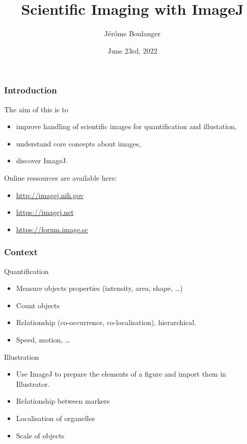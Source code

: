 \documentclass[ignorenonframetext,aspectratio=169,10pt,xcolor=table]{beamer}
\title{Scientific Imaging with ImageJ}
\author{J\'er\^ome Boulanger}
\date{June 23rd, 2022}
\begin{document}
\begin{frame}
  \maketitle
\end{frame}

\begin{frame} \frametitle<presentation>{Introduction} The aim of this
   is to
  \begin{itemize}
  \item improve handling of scientific images for quantification and
    illustation,
  \item understand core concepts about images,
  \item discover ImageJ.
  \end{itemize} Online ressources are available here:
  \begin{itemize}
  \item \url{http://imagej.nih.gov}
  \item \url{https://imagej.net}
  \item \url{https://forum.image.sc}
  \end{itemize}
\end{frame}

\begin{frame} \frametitle{Context}
  \begin{block}{Quantification}
    \begin{itemize}
    \item Measure objects properties (intensity, area, shape, \dots)
    \item Count objects
    \item Relationship (co-occurrence, co-localisation), hierarchical.
    \item Speed, motion, \dots
    \end{itemize}
  \end{block}
  \begin{block}{Illustration}

    \begin{itemize}
    \item Use ImageJ to prepare the elements of a figure and import
      them in Illustrator.
    \item Relationship between markers
    \item Localisation of organelles
    \item Scale of objects
    \end{itemize}
  \end{block}
\end{frame}
\end{document}
